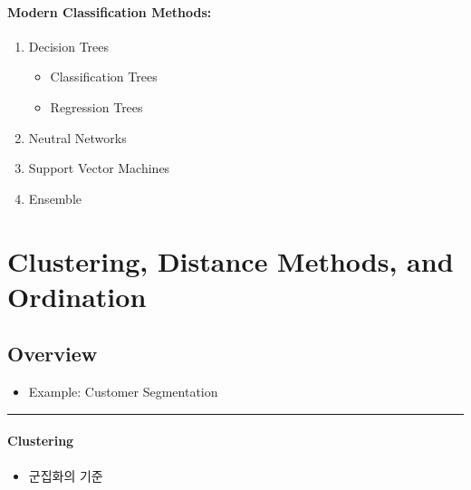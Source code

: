 \documentclass[
]{book}
\providecommand{\tightlist}{%
  \setlength{\itemsep}{0pt}\setlength{\parskip}{0pt}}
\begin{document}
{{{\hypertarget{modern-classification-methods}{%
\paragraph{Modern Classification Methods:}\label{modern-classification-methods}}

\begin{enumerate}
\def\labelenumi{\arabic{enumi}.}
\tightlist
\item
  Decision Trees

  \begin{itemize}
  \tightlist
  \item
    Classification Trees
  \item
    Regression Trees
  \end{itemize}
\item
  Neutral Networks
\item
  Support Vector Machines
\item
  Ensemble
\end{enumerate}

\hypertarget{clustering-distance-methods-and-ordination}{%
\section{Clustering, Distance Methods, and Ordination}\label{clustering-distance-methods-and-ordination}}

\hypertarget{overview-5}{%
\subsection{Overview}\label{overview-5}}

\begin{itemize}
\tightlist
\item
  Example: Customer Segmentation
\end{itemize}

\begin{center}\rule{0.5\linewidth}{0.5pt}\end{center}

\hypertarget{clustering}{%
\paragraph{Clustering}\label{clustering}}

\begin{itemize}
\tightlist
\item
  군집화의 기준
\end{itemize}

}}}
\end{document}
